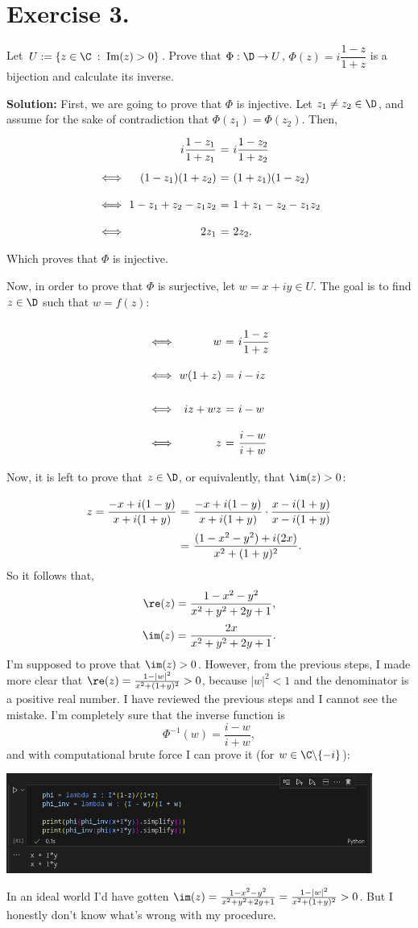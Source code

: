 \section*{Exercise 3.}
Let $U := \{ z \in\C \;:\; \mbox{Im}(z) > 0\}$. Prove that $\Phi: \D \to U$, $\Phi(z) = i \dfrac{1-z}{1+z}$ is a bijection and calculate its inverse.

\textbf{Solution:} First, we are going to prove that $\Phi$ is injective. Let $z_1 \neq z_2 \in \D$, and assume for the sake of contradiction that $\Phi(z_1) = \Phi(z_2)$. Then,
\[ 
\everymath{\displaystyle}
\arraycolsep=1.8pt\def\arraystretch{2}
\begin{array}{rrcl}
    & i\frac{1-z_1}{1+z_1} & = & i\frac{1-z_2}{1+z_2}\\
    \iff & (1-z_1)(1+z_2) & = & (1+z_1)(1-z_2) \\
    \iff & 1-z_1+z_2-z_1z_2 & = & 1+z_1-z_2-z_1z_2\\
    \iff & 2z_1 & = & 2z_2.
\end{array}
 \]
Which proves that $\Phi$ is injective.

Now, in order to prove that $\Phi$ is surjective, let $w = x+iy \in U$. The goal is to find $z \in \D$ such that $w = f(z)$:

\[ \everymath{\displaystyle}
\arraycolsep=1.8pt\def\arraystretch{2.5}
\begin{array}{rrcl}
    \iff & w & = & i \frac{1 - z}{1 + z}\\
    \iff & w(1+z) & = & i-iz \\
    \iff & iz+wz & = & i-w \\
    \iff & z & = & \frac{i-w}{i+w} 
\end{array} \]

Now, it is left to prove that $z \in \D$, or equivalently, that $\im(z) > 0$:
\[ \everymath{\displaystyle}
\arraycolsep=1.8pt\def\arraystretch{2.5}
\begin{array}{rcl}
    z = \frac{-x+i(1-y)}{x+i(1+y)} & = &  \frac{-x+i(1-y)}{x+i(1+y)} \cdot \frac{x-i(1+y)}{x-i(1+y)}\\
    & = & \frac{(1-x^2-y^2) + i(2x)}{x^2 + (1+y)^2}.
\end{array}\]
So it follows that,
\[ \re(z) = \frac{1-x^2-y^2}{x^2 + y^2 + 2y + 1}, \]
\[ \im(z) = \frac{2x}{x^2 + y^2 + 2y + 1}. \]
I'm supposed to prove that $\im(z) > 0$. However, from the previous steps, I made more clear that $\re(z) = \frac{1-|w|^2}{x^2 + (1+y)^2} > 0$, because $|w|^2 < 1$ and the denominator is a positive real number. I have reviewed the previous steps and I cannot see the mistake. I'm completely sure that the inverse function is
\[ \Phi^{-1}(w) = \dfrac{i-w}{i+w}, \]
and with computational brute force I can prove it (for $w \in \C\backslash\{-i\}$):

\begin{center}
    \includegraphics*[width = 0.9\textwidth]{../pictures/hw1ex3pic1.png}
\end{center}

In an ideal world I'd have gotten $\im(z) = \frac{1-x^2-y^2}{x^2 + y^2 + 2y + 1} = \frac{1-|w|^2}{x^2 + (1+y)^2} > 0$. But I honestly don't know what's wrong with my procedure.
